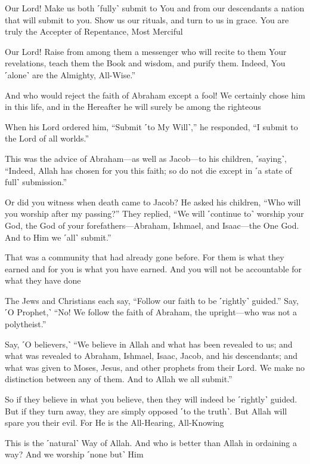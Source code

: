 Our Lord! Make us both ˹fully˺ submit to You and from our descendants a nation that will submit to you. Show us our rituals, and turn to us in grace. You are truly the Accepter of Repentance, Most Merciful

Our Lord! Raise from among them a messenger who will recite to them Your revelations, teach them the Book and wisdom, and purify them. Indeed, You ˹alone˺ are the Almighty, All-Wise.”

And who would reject the faith of Abraham except a fool! We certainly chose him in this life, and in the Hereafter he will surely be among the righteous

When his Lord ordered him, “Submit ˹to My Will˺,” he responded, “I submit to the Lord of all worlds.”

This was the advice of Abraham—as well as Jacob—to his children, ˹saying˺, “Indeed, Allah has chosen for you this faith; so do not die except in ˹a state of full˺ submission.”

Or did you witness when death came to Jacob? He asked his children, “Who will you worship after my passing?” They replied, “We will ˹continue to˺ worship your God, the God of your forefathers—Abraham, Ishmael, and Isaac—the One God. And to Him we ˹all˺ submit.”

That was a community that had already gone before. For them is what they earned and for you is what you have earned. And you will not be accountable for what they have done

The Jews and Christians each say, “Follow our faith to be ˹rightly˺ guided.” Say, ˹O Prophet,˺ “No! We follow the faith of Abraham, the upright—who was not a polytheist.”

Say, ˹O believers,˺ “We believe in Allah and what has been revealed to us; and what was revealed to Abraham, Ishmael, Isaac, Jacob, and his descendants; and what was given to Moses, Jesus, and other prophets from their Lord. We make no distinction between any of them. And to Allah we all submit.”

So if they believe in what you believe, then they will indeed be ˹rightly˺ guided. But if they turn away, they are simply opposed ˹to the truth˺. But Allah will spare you their evil. For He is the All-Hearing, All-Knowing

This is the ˹natural˺ Way of Allah. And who is better than Allah in ordaining a way? And we worship ˹none but˺ Him

